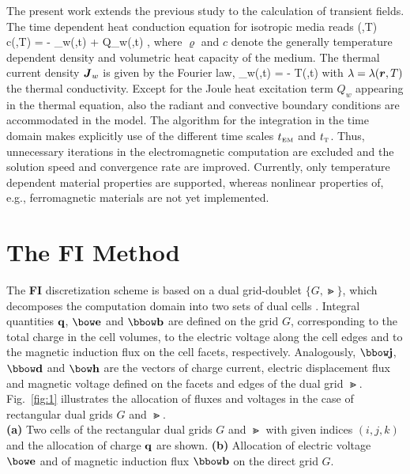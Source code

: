 \documentclass[twocolumn]{IEEEtran}
\begin{document}
The present work extends the previous study \cite{RienenPinderWeiland96e:01}
to the calculation of transient fields. The time dependent heat conduction
equation for isotropic media reads
\beq
\varrho(,T) c(,T)
 = - \di{}_w(,t) +
Q_w(,t) \; ,
\label{eqn:1}
\enq
where $\varrho$ and $c$ denote the generally temperature dependent
density and volumetric heat capacity of the medium. The thermal
current density $\mbox{\boldmath$J$}_w$ is given by the Fourier law,
\beq
{}_w(,t) = - \lambda\grad T(,t)
\label{eqn:2}
\enq
with $\lambda=\lambda(\mbox{\boldmath$r$},T)$ the thermal conductivity. Except
for the Joule heat excitation term $Q_w$ appearing in the thermal
equation, also the radiant and convective boundary conditions are
accommodated in the model. The algorithm for the integration in
the time domain makes explicitly use of the different time scales
$t_{\rm\scriptscriptstyle EM}$ and $t_{\rm\scriptscriptstyle T}$. Thus, unnecessary iterations in the
electromagnetic computation are excluded and the solution speed and
convergence rate are improved. Currently, only temperature dependent
material properties are supported, whereas nonlinear properties of,
e.g., ferromagnetic materials are not yet implemented.

\section{The {\bf FI} Method}
The {\bf FI} discretization scheme is based on a dual grid-doublet
$\{G,\Gt\}$, which decomposes the computation domain into two sets of
dual cells \cite{Weiland96e:01}. Integral quantities $\mbox{\rm\bf q}$, $\ve$ and
$\fb$ are defined on the grid $G$, corresponding to the total charge
in the cell volumes, to the electric voltage along the cell edges
and to the magnetic induction flux on the cell facets, respectively.
Analogously, $\fj$, $\fd$ and $\vh$ are the vectors of charge current,
electric displacement flux and magnetic voltage defined on the
facets and edges of the dual grid $\Gt$. Fig.~\ref{fig:1}
illustrates the allocation of fluxes and voltages in the
case of rectangular dual grids $G$ and $\Gt$.
\befig[htb]
\centering
\mbox{\epsfxsize=86mm} \\[-5pt]
\caption{{\bf (a)} Two cells of the rectangular dual grids $G$ and
$\Gt$ with given indices $(i,j,k)$ and the allocation of charge $\mbox{\rm\bf q}$
are shown. {\bf (b)} Allocation of electric voltage $\ve$
and of magnetic induction flux $\fb$ on the direct grid $G$.}
\label{fig:1}
\enfig
\end{document}
